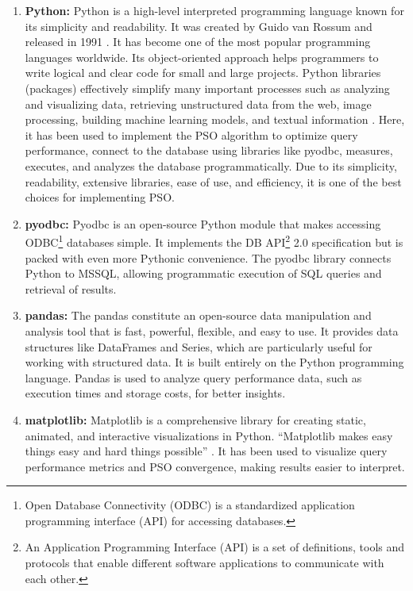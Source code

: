 \begin{enumerate}[label=(\roman*)]
\item\textbf{Python:} Python is a high-level interpreted programming language known for its simplicity and readability. It was created by Guido van Rossum and released in 1991 \cite{martin2023stam,wijanarko2020prediksi} . It has become one of the most popular programming languages worldwide. Its object-oriented approach helps programmers to write logical and clear code for small and large projects. Python libraries (packages) effectively simplify many important processes such as analyzing and visualizing data, retrieving unstructured data from the web, image processing, building machine learning models, and textual information \cite{Samira_Gholizadeh2022}. Here, it has been used to implement the PSO algorithm to optimize query performance, connect to the database using libraries like pyodbc, measures, executes, and analyzes the database programmatically. Due to its simplicity, readability, extensive libraries, ease of use, and efficiency, it is one of the best choices for implementing PSO.

\item\textbf{pyodbc:} Pyodbc is an open-source Python module that makes accessing ODBC\footnote{Open Database Connectivity (ODBC) is a standardized application programming interface (API) for accessing databases.} databases simple. It implements the DB API\footnote{An Application Programming Interface (API) is a set of definitions, tools and protocols that enable different software applications to communicate with each other.} 2.0 specification but is packed with even more Pythonic convenience. The pyodbc library connects Python to MSSQL, allowing programmatic execution of SQL queries and retrieval of results.

\item\textbf{pandas:} The pandas constitute an open-source data manipulation and analysis tool that is fast, powerful, flexible, and easy to use. It provides data structures like DataFrames and Series, which are particularly useful for working with structured data. It is built entirely on the Python programming language. Pandas is used to analyze query performance data, such as execution times and storage costs, for better insights.

\item\textbf{matplotlib:} Matplotlib is a comprehensive library for creating static, animated, and interactive visualizations in Python. \enquote{Matplotlib makes easy things easy and hard things possible} \cite{matplotlib}. It has been used to visualize query performance metrics and PSO convergence, making results easier to interpret.


\end{enumerate}

